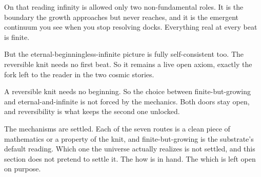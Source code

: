 On that reading infinity is allowed only two non-fundamental roles. It is the boundary the growth approaches but never reaches, and it is the emergent continuum you see when you stop resolving docks. Everything real at every beat is finite.

But the eternal-beginningless-infinite picture is fully self-consistent too. The reversible knit needs no first beat. So it remains a live open axiom, exactly the fork left to the reader in the two cosmic stories.

\begin{principle}
A reversible knit needs no beginning. So the choice between finite-but-growing and eternal-and-infinite is not forced by the mechanics. Both doors stay open, and reversibility is what keeps the second one unlocked.
\end{principle}

The mechanisms are settled. Each of the seven routes is a clean piece of mathematics or a property of the knit, and finite-but-growing is the substrate's default reading. Which one the universe actually realizes is not settled, and this section does not pretend to settle it. The how is in hand. The which is left open on purpose.
